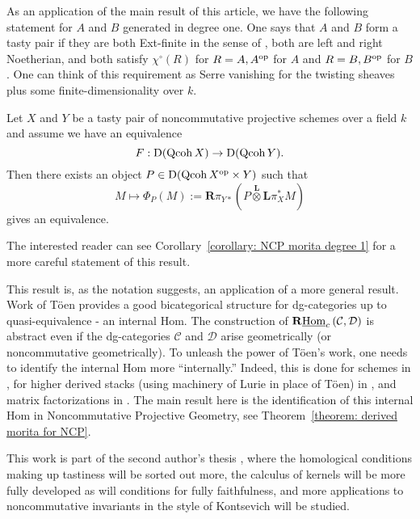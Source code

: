\documentclass[dissertation.tex]{subfiles}
\begin{document}
As an application of the main result of this article, we have the following statement for \(A\) and \(B\) generated in degree one.
One says that \(A\) and \(B\) form a tasty pair if they are both Ext-finite in the sense of \cite{VdB}, both are left and right Noetherian, and both satisfy \(\chi^\circ(R)\) for \(R=A,A^{\operatorname{op}}\) for \(A\) and \(R = B, B^{\operatorname{op}}\) for \(B\).
One can think of this requirement as Serre vanishing for the twisting sheaves plus some finite-dimensionality over \(k\).

\begin{theorem}
  Let \(X\) and \(Y\) be a tasty pair of noncommutative projective schemes over a field \(k\) and assume we have an equivalence 
  \begin{displaymath}
    F : \mathrm{D}(\operatorname{Qcoh}X) \to \mathrm{D}(\operatorname{Qcoh}Y). 
  \end{displaymath}
  Then there exists an object \(P \in \mathrm{D}(\operatorname{Qcoh}X^{\operatorname{op}} \times Y)\) such that
  \begin{displaymath}
    M \mapsto \Phi_P (M) := \mathbf{R}\pi_{Y \ast} \left( P \overset{\mathbf{L}}{\otimes} \mathbf{L}\pi_X^\ast M \right) 
  \end{displaymath}
  gives an equivalence.  
\end{theorem}

\noindent
The interested reader can see Corollary~\ref{corollary: NCP morita degree 1} for a more careful statement of this result.

This result is, as the notation suggests, an application of a more general result. Work of T\"oen provides a good bicategorical structure for dg-categories up to quasi-equivalence \cite{Toen} - an internal Hom. The construction of \(\mathbf{R}\underline{\operatorname{Hom}}_c\left(\mathcal C, \mathcal D\right)\) is abstract even if the dg-categories \(\mathcal C\) and \(\mathcal D\) arise geometrically (or noncommutative geometrically). To unleash the power of T\"oen's work, one needs to identify the internal Hom more ``internally.'' Indeed, this is done for schemes in \cite{Toen}, for higher derived stacks (using machinery of Lurie in place of T\"oen) in \cite{BFN}, and matrix factorizations in \cite{Dyckerhoff,PV,BFK}. The main result here is the identification of this internal Hom in Noncommutative Projective Geometry, see Theorem~\ref{theorem: derived morita for NCP}. 

This work is part of the second author's thesis \cite{Farman}, where the homological conditions making up tastiness will be sorted out more, the calculus of kernels will be more fully developed as will conditions for fully faithfulness, and more applications to noncommutative invariants in the style of Kontsevich will be studied.
\end{document}
